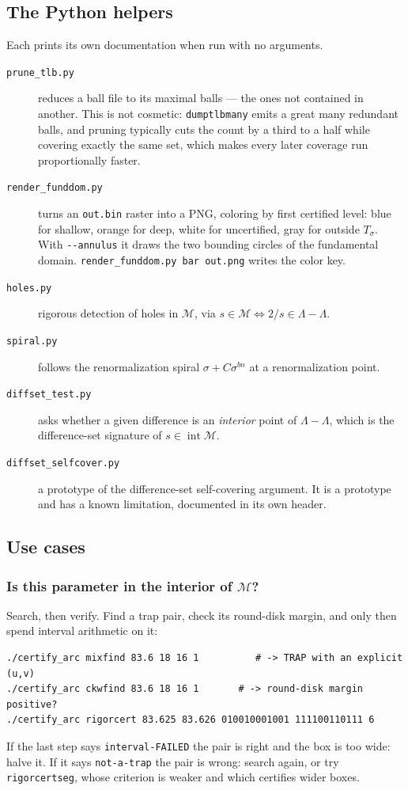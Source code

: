 \documentclass{amsart}
\begin{document}
\subsection{The Python helpers}

Each prints its own documentation when run with no arguments.

\begin{description}
\item[\texttt{prune\_tlb.py}] reduces a ball file to its maximal balls --- the ones not contained
in another.  This is not cosmetic: \texttt{dumptlbmany} emits a great many redundant balls, and
pruning typically cuts the count by a third to a half while covering exactly the same set, which
makes every later coverage run proportionally faster.
\item[\texttt{render\_funddom.py}] turns an \texttt{out.bin} raster into a PNG, coloring by first
certified level: blue for shallow, orange for deep, white for uncertified, gray for outside
$T_\sigma$.  With \verb|--annulus| it draws the two bounding circles of the fundamental domain.
\texttt{render\_funddom.py bar out.png} writes the color key.
\item[\texttt{holes.py}] rigorous detection of holes in $\mathcal{M}$, via
$s \in \mathcal{M} \iff 2/s \in \Lambda - \Lambda$.
\item[\texttt{spiral.py}] follows the renormalization spiral $\sigma + C\sigma^{bn}$ at a
renormalization point.
\item[\texttt{diffset\_test.py}] asks whether a given difference is an \emph{interior} point of
$\Lambda - \Lambda$, which is the difference-set signature of $s \in \operatorname{int}\mathcal{M}$.
\item[\texttt{diffset\_selfcover.py}] a prototype of the difference-set self-covering argument.
It is a prototype and has a known limitation, documented in its own header.
\end{description}

\subsection{Use cases}

\subsubsection{Is this parameter in the interior of $\mathcal{M}$?}

Search, then verify.  Find a trap pair, check its round-disk margin, and only then spend interval
arithmetic on it:
\begin{verbatim}
./certify_arc mixfind 83.6 18 16 1          # -> TRAP with an explicit (u,v)
./certify_arc ckwfind 83.6 18 16 1       # -> round-disk margin positive?
./certify_arc rigorcert 83.625 83.626 010010001001 111100110111 6
\end{verbatim}
If the last step says \texttt{interval-FAILED} the pair is right and the box is too wide: halve it.
If it says \texttt{not-a-trap} the pair is wrong: search again, or try
\texttt{rigorcertseg}, whose criterion is weaker and which certifies wider boxes.
\end{document}
